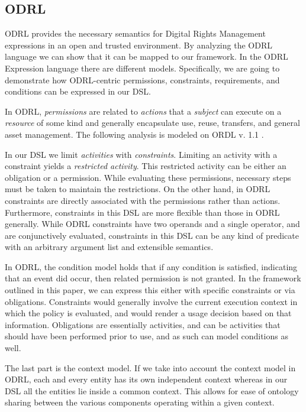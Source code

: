 \subsection{ODRL}\label{sec:model-odrl}
ODRL provides the necessary semantics for Digital Rights Management expressions in an open and trusted environment. By analyzing the ODRL language we can show that it can be mapped to our framework. In the ODRL Expression language there are different models.  Specifically, we are going to demonstrate how ODRL-centric permissions, constraints, requirements, and conditions can be expressed in our DSL.

In ODRL, \emph{permissions} are related to \emph{actions} that a \emph{subject} can execute on a \emph{resource} of some kind and generally encapsulate use, reuse, transfers, and general asset management.  The following analysis is modeled on ORDL v. 1.1 \cite{Ia:02}.

In our DSL we limit \emph{activities} with \emph{constraints}. Limiting an activity with a constraint yields a \emph{restricted activity}. This restricted activity can be either an obligation or a permission. While evaluating these permissions, necessary steps must be taken to maintain the restrictions. On the other hand, in ODRL constraints are directly associated with the permissions rather than actions.  Furthermore, constraints in this DSL are more flexible than those in ODRL generally. While ODRL constraints have two operands and a single operator, and are conjunctively evaluated, constraints in this DSL can be any kind of predicate with an arbitrary argument list and extensible semantics.

In ODRL, the condition model holds that if any condition is satisfied, indicating that an event did occur, then related permission is not granted. In the framework outlined in this paper, we can express this either with specific constraints or via obligations.  Constraints would generally involve the current execution context in which the policy is evaluated, and would render a usage decision based on that information.  Obligations are essentially activities, and can be activities that should have been performed prior to use, and as such can model conditions as well.

The last part is the context model. If we take into account the context model in ODRL, each and every entity has its own independent context whereas in our DSL all the entities lie inside a common context.  This allows for ease of ontology sharing between the various components operating within a given context.

